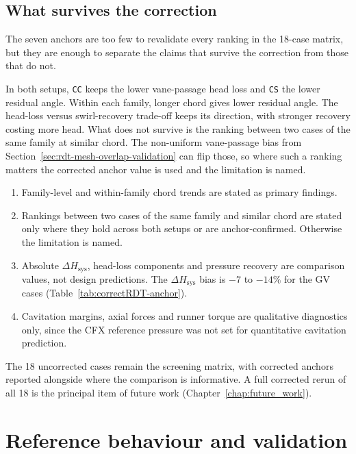\subsection{What survives the correction}
\label{sec:rdt-mesh-overlap-impact}

The seven anchors are too few to revalidate every ranking in the 18-case matrix, but they are enough to separate the claims that survive the correction from those that do not.

In both setups, \texttt{CC} keeps the lower vane-passage head loss and \texttt{CS} the lower residual angle. Within each family, longer chord gives lower residual angle. The head-loss versus swirl-recovery trade-off keeps its direction, with stronger recovery costing more head. What does not survive is the ranking between two cases of the same family at similar chord. The non-uniform vane-passage bias from Section~\ref{sec:rdt-mesh-overlap-validation} can flip those, so where such a ranking matters the corrected anchor value is used and the limitation is named.

\begin{enumerate}
    \item Family-level and within-family chord trends are stated as primary findings.
    \item Rankings between two cases of the same family and similar chord are stated only where they hold across both setups or are anchor-confirmed. Otherwise the limitation is named.
    \item Absolute $\Delta H_\mathrm{sys}$, head-loss components and pressure recovery are comparison values, not design predictions. The $\Delta H_\mathrm{sys}$ bias is $-7$ to $-14\%$ for the GV cases (Table~\ref{tab:correctRDT-anchor}).
    \item Cavitation margins, axial forces and runner torque are qualitative diagnostics only, since the CFX reference pressure was not set for quantitative cavitation prediction.
\end{enumerate}

The 18 uncorrected cases remain the screening matrix, with corrected anchors reported alongside where the comparison is informative. A full corrected rerun of all 18 is the principal item of future work (Chapter~\ref{chap:future_work}).

\section{Reference behaviour and validation}
\label{sec:reference-and-validation}


